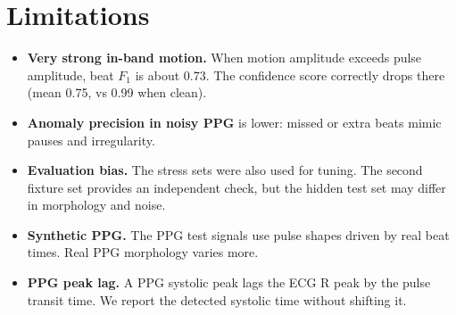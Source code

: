 \documentclass[10pt,a4paper]{article}
\begin{document}
\section{Limitations}
\begin{itemize}
  \item \textbf{Very strong in-band motion.} When motion amplitude exceeds pulse amplitude, beat $F_1$ is about 0.73.
        The confidence score correctly drops there (mean 0.75, vs 0.99 when clean).
  \item \textbf{Anomaly precision in noisy PPG} is lower: missed or extra beats mimic pauses and irregularity.
  \item \textbf{Evaluation bias.} The stress sets were also used for tuning. The second fixture set provides an
        independent check, but the hidden test set may differ in morphology and noise.
  \item \textbf{Synthetic PPG.} The PPG test signals use pulse shapes driven by real beat times. Real PPG morphology
        varies more.
  \item \textbf{PPG peak lag.} A PPG systolic peak lags the ECG R peak by the pulse transit time. We report the
        detected systolic time without shifting it.
\end{itemize}
\end{document}
